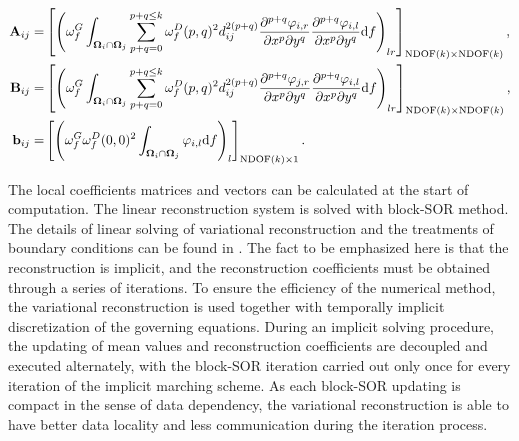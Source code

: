 \begin{equation}
    \label{eq:vrCoeffs}
    \begin{aligned}
        \mathbf{A}_{ij} = &
        \left[
            \left({
                \omega_f^G\int_{\OO_i \cap \OO_j}{
                    \sum_{p+q=0}^{p + q\leq k}
                    \omega_f^D(p,q)^2
                    d_{ij}^{2(p+q)}
                    \partialderivative{^{p+q}\varphi_{i,r}}{x^p\partial y^q}
                    \partialderivative{^{p+q}\varphi_{i,l}}{x^p\partial y^q}
                    \dd f}
            }\right)_{lr}
        \right]_{\mathrm{NDOF}(k) \times \mathrm{NDOF}(k)}, \\
        \mathbf{B}_{ij}=  &
        \left[
            \left({
                \omega_f^G\int_{\OO_i \cap \OO_j}{
                    \sum_{p+q=0}^{p + q\leq k}
                    \omega_f^D(p,q)^2
                    d_{ij}^{2(p+q)}
                    \partialderivative{^{p+q}\varphi_{j,r}}{x^p\partial y^q}
                    \partialderivative{^{p+q}\varphi_{i,l}}{x^p\partial y^q}
                    \dd f}
            }\right)_{lr}
        \right]_{\mathrm{NDOF}(k) \times \mathrm{NDOF}(k)}, \\
        \mathbf{b}_{ij}=  &
        \left[
            \left({
                    \omega_f^G\omega_f^D(0,0)^2
                    \int_{\OO_i \cap \OO_j}{
                        \varphi_{i,l}
                        \dd f}
                }\right)_{l}
        \right]_{\mathrm{NDOF}(k) \times 1}.                \\
    \end{aligned}
\end{equation}

The local coefficients matrices and vectors  can be
calculated at the start of computation.
The linear reconstruction system 
is solved with block-SOR method.
The details of linear solving of variational reconstruction and the treatments of
boundary conditions can be found in \cite{wang2017compact_VR}.
The fact to be emphasized here is that
the reconstruction is implicit, and
the reconstruction coefficients must be
obtained through a series of
iterations.
To ensure the efficiency of the numerical method,
the variational reconstruction is used
together with temporally implicit discretization
of the governing equations.
During an implicit solving procedure,
the updating of mean values and reconstruction
coefficients are decoupled
and executed alternately, with the block-SOR
iteration carried out only once for every iteration
of the implicit marching scheme.
As each block-SOR updating is compact in the sense of data dependency,
the variational reconstruction is able to have better data locality and
less communication during the iteration process.



